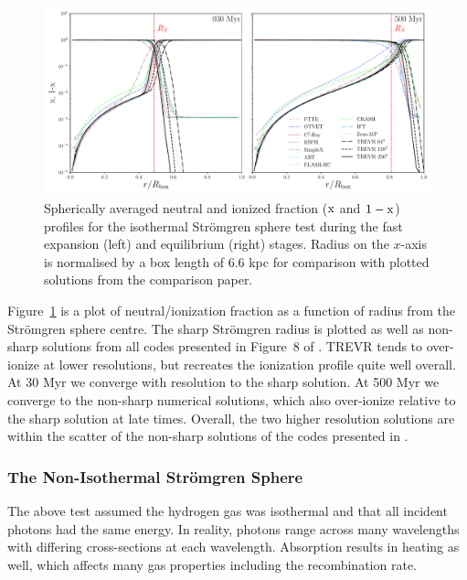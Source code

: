 \documentclass[fleq,usenatbib]{mnras}
\newcommand{\acro}{TREVR}
\newcommand{\strom}{Str\"omgren}
\begin{document}
{\begin{figure}
\includegraphics[width=0.95\linewidth]{Figures/strom_iso_fraction.pdf}
\caption{Spherically averaged neutral and ionized fraction 
($\rm x$ and $\rm 1-x$) profiles for the isothermal \strom{} sphere test 
during the fast expansion (left) and equilibrium (right) stages. Radius on the 
$x$-axis is normalised by a box length of 6.6 kpc for comparison with plotted 
solutions from the \protect\cite{ilievEt06} comparison paper.}
\label{fig:stromiso}
\end{figure}
Figure~\ref{fig:stromiso} is a plot of neutral/ionization fraction as a 
function of radius from the \strom{} sphere centre. The sharp \strom{} radius 
is plotted as well as non-sharp solutions from all codes presented in Figure~8 
of \cite{ilievEt06}. \acro{} tends to over-ionize at lower resolutions, but 
recreates the ionization profile quite well overall. At 30 Myr we converge 
with resolution to the sharp solution. At 500 Myr we converge to the non-sharp 
numerical solutions, which also over-ionize relative to the sharp solution at 
late times. Overall, the two higher resolution solutions are within the 
scatter of the non-sharp solutions of the codes presented in \cite{ilievEt06}. 

\subsubsection{The Non-Isothermal \strom{} Sphere}
The above test assumed the hydrogen gas was isothermal and that all incident 
photons had the same energy. In reality, photons range across many wavelengths 
with differing cross-sections at each wavelength. Absorption results in 
heating as well, which affects many gas properties including the recombination rate.

}
\end{document}
